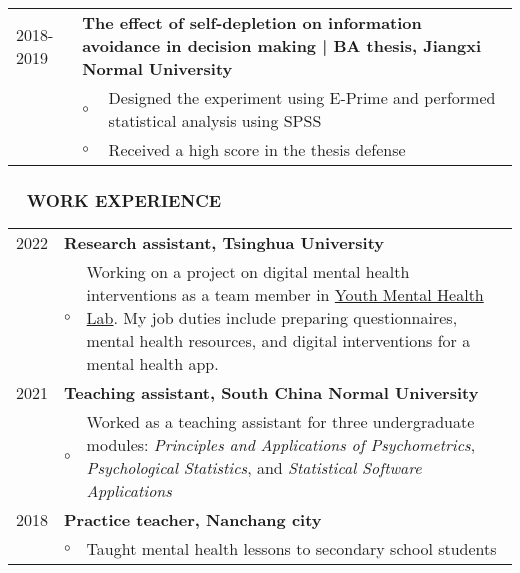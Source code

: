 \documentclass[a4paper, 12pt]{article}
\begin{document}
\begin{tabularx}{\textwidth}{p{2cm} p{0.1cm} X}
    2018-2019 & \multicolumn{2}{X}{\textbf{The effect of self-depletion on information avoidance in decision making | BA thesis, Jiangxi Normal University}} \\
    & $\circ$ & Designed the experiment using E-Prime and performed statistical analysis using SPSS \\
    & $\circ$ & Received a high score in the thesis defense \\

    \end{tabularx}

\subsubsection*{ \ \ WORK EXPERIENCE}

\begin{tabularx}{\textwidth}{p{2cm} p{0.1cm} X}

    2022 & \multicolumn{2}{X}{\textbf{Research assistant, Tsinghua University}} \\
    & $ \circ $ & Working on a project on digital mental health interventions as a team member in \href{https://www.ymhlab.com}{Youth Mental Health Lab}. My job duties include preparing questionnaires, mental health resources, and digital interventions for a mental health app. \\
    

    2021 & \multicolumn{2}{X}{\textbf{Teaching assistant, South China Normal University}} \\
    & $ \circ $ & Worked as a teaching assistant for three undergraduate modules: \textit{Principles and Applications of Psychometrics}, \textit{Psychological Statistics}, and \textit{Statistical Software Applications} \\

    2018 & \multicolumn{2}{X}{\textbf{Practice teacher, Nanchang city}} \\
    & $ \circ $ & Taught mental health lessons to secondary school students

    \end{tabularx}
\end{document}

